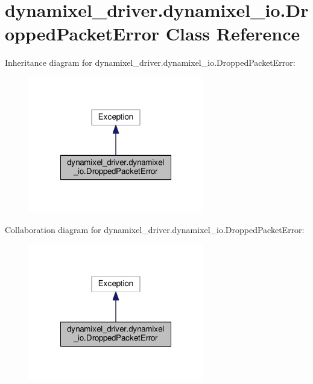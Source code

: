 \hypertarget{classdynamixel__driver_1_1dynamixel__io_1_1_dropped_packet_error}{}\section{dynamixel\+\_\+driver.\+dynamixel\+\_\+io.\+Dropped\+Packet\+Error Class Reference}
\label{classdynamixel__driver_1_1dynamixel__io_1_1_dropped_packet_error}


Inheritance diagram for dynamixel\+\_\+driver.\+dynamixel\+\_\+io.\+Dropped\+Packet\+Error\+:
\nopagebreak
\begin{figure}[H]
\begin{center}
\leavevmode
\includegraphics[width=216pt]{d9/dc1/classdynamixel__driver_1_1dynamixel__io_1_1_dropped_packet_error__inherit__graph}
\end{center}
\end{figure}


Collaboration diagram for dynamixel\+\_\+driver.\+dynamixel\+\_\+io.\+Dropped\+Packet\+Error\+:
\nopagebreak
\begin{figure}[H]
\begin{center}
\leavevmode
\includegraphics[width=216pt]{df/d19/classdynamixel__driver_1_1dynamixel__io_1_1_dropped_packet_error__coll__graph}
\end{center}
\end{figure}
